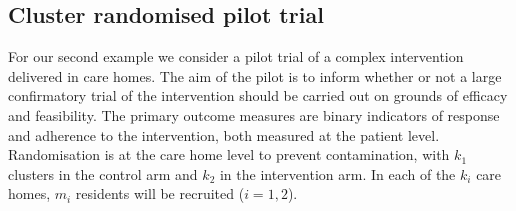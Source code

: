 \documentclass{article} %
\begin{document}


\subsection{Cluster randomised pilot trial}

For our second example we consider a pilot trial of a complex intervention delivered in care homes. The aim of the pilot is to inform whether or not a large confirmatory trial of the intervention should be carried out on grounds of efficacy and feasibility. The primary outcome measures are binary indicators of response and adherence to the intervention, both measured at the patient level. Randomisation is at the care home level to prevent contamination, with $k_{1}$ clusters in the control arm and $k_{2}$ in the intervention arm. In each of the $k_{i}$ care homes, $m_{i}$ residents will be recruited ($i = 1,2$).
\end{document}
